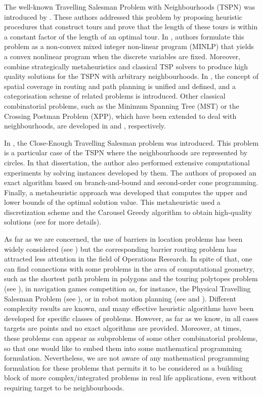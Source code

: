 \documentclass[a4paper,  review, authoryear, 1p.]{elsarticle}
\begin{document}
	The well-known Travelling Salesman Problem with Neighbourhoods (TSPN) was introduced by \citet{arkin1994a}. These authors addressed this problem by proposing heuristic procedures that construct tours and prove that the length of these tours is within a constant factor of the length of an optimal tour. In \citet{gentilini2013}, authors formulate this problem as a non-convex mixed integer non-linear program (MINLP) that yields a convex nonlinear program when the discrete variables are fixed. Moreover, \citet{yuan2017} combine strategically metaheuristics and classical TSP solvers to produce high quality solutions for the TSPN with arbitrary neighbourhoods. In \citet{glock2023}, the concept of spatial coverage in routing and path planning is unified and defined, and a categorisation scheme of related problems is introduced. Other classical combinatorial problems, such as the Minimum Spanning Tree (MST) or the Crossing Postman Problem (XPP), which have been extended to deal with neighbourhoods, are developed in \citet{blanco2017} and \citet{puerto2022c}, respectively. 
	
	In \citet{mennell2009a}, the Close-Enough Travelling Salesman problem was introduced. This problem is a particular case of the TSPN where the neighbourhoods are represented by circles. In that dissertation, the author also performed extensive computational experiments by solving instances developed by them. The authors of \citet{coutinho2016} proposed an exact algorithm based on branch-and-bound and second-order cone programming. Finally, a metaheuristic approach was developed that computes the upper and lower bounds of the optimal solution value. This metaheuristic used a discretization scheme and the Carousel Greedy algorithm to obtain high-quality solutions (see \citet{carrabs2020} for more details).
	
	As far as we are concerned, the use of barriers in location problems has been widely considered (see \citet{klamroth2002a}) but the corresponding barrier routing problem has attracted less attention in the field of Operations Research. In spite of that, one can find connections with some problems in the area of computational geometry, such as the shortest path problem in polygons and the touring polytopes problem (see \citet{mitchell2017a}), in navigation games competition as, for instance, the Physical Travelling Salesman Problem (see \citet{d.perez2014}), or in robot motion planning (see \citet{y.k.hwang1992} and \citet{j..-p.laumond1994}).  Different complexity results are known, and many effective heuristic algorithms have been developed for specific classes of problems. However, as far as we know, in all cases targets are points and no exact algorithms are provided. Moreover, at times, these problems can appear as subproblems of some other combinatorial problems, so that one would like to embed them into some mathematical programming formulation. Nevertheless, we are not aware of any mathematical programming formulation for these problems that permits it to be considered as a building block of more complex/integrated problems in real life applications, even without requiring target to be neighbourhoods.
	
\end{document}
